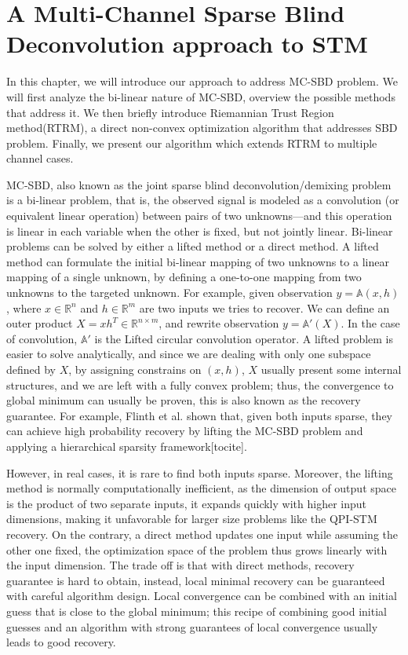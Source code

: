 \section{A Multi-Channel Sparse Blind Deconvolution approach to STM}

In this chapter, we will introduce our approach to address \ac{MC-SBD} problem. We will first analyze the bi-linear nature of \ac{MC-SBD}, overview the possible methods that address it. We then briefly introduce Riemannian Trust Region method(RTRM), a direct non-convex optimization algorithm that addresses \ac{SBD} problem. Finally, we present our algorithm which extends \ac{RTRM} to multiple channel cases. 

\ac{MC-SBD}, also known as the joint sparse blind deconvolution/demixing problem is a bi-linear problem, that is, the observed signal is modeled as a convolution (or equivalent linear operation) between pairs of two unknowns—and this operation is linear in each variable when the other is fixed, but not jointly linear. Bi-linear problems can be solved by either a lifted method or a direct method. A lifted method can formulate the initial bi-linear mapping of two unknowns to a linear mapping of a single unknown, by defining a one-to-one mapping from two unknowns to the targeted unknown. For example, given observation $y = \mathbb{A}(x,h)$, where $x \in \mathbb{R}^n$ and $h \in \mathbb{R}^m$ are two inputs we tries to recover. We can define an outer product $X = xh^T\in \mathbb{R}^{n\times m}$, and rewrite observation $y = \mathbb{A'}(X)$. In the case of convolution, $\mathbb{A'}$ is the Lifted circular convolution operator. A lifted problem is easier to solve analytically, and since we are dealing with only one subspace defined by $X$, by assigning constrains on $(x,h)$,  $X$ usually present some internal structures, and we are left with a fully convex problem; thus, the convergence to global minimum can usually be proven, this is also known as the recovery guarantee. For example, Flinth et al. shown that, given both inputs sparse, they can achieve high probability recovery by lifting the \ac{MC-SBD} problem and applying a hierarchical sparsity framework[tocite]. 

However, in real cases, it is rare to find both inputs sparse. Moreover, the lifting method is normally computationally inefficient, as the dimension of output space is the product of two separate inputs, it expands quickly with higher input dimensions, making it unfavorable for larger size problems like the QPI-STM recovery. On the contrary, a direct method updates one input while assuming the other one fixed, the optimization space of the problem thus grows linearly with the input dimension. The trade off is that with direct methods, recovery guarantee is hard to obtain, instead, local minimal recovery can be guaranteed with careful algorithm design. Local convergence can be combined with an initial guess that is close to the global minimum; this recipe of combining good initial guesses and an algorithm with strong guarantees of local convergence usually leads to good recovery. 

